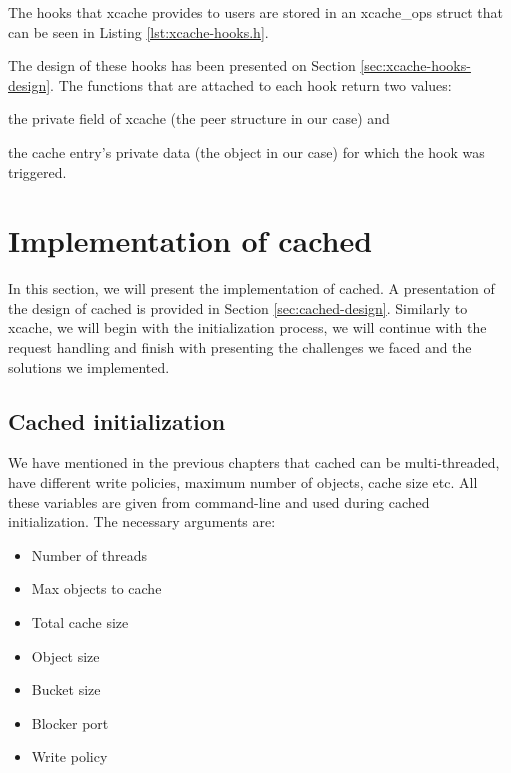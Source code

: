 The hooks that xcache provides to users are stored in an xcache\_ops struct 
that can be seen in Listing \ref{lst:xcache-hooks.h}.


The design of these hooks has been presented on Section 
\ref{sec:xcache-hooks-design}. The functions that are attached to each hook 
return two values:
\begin{inparaenum}
\item the private field of xcache (the peer structure in our case) and
\item the cache entry's private data (the object in our case) for which the 
	hook was triggered.
\end{inparaenum}

\section{Implementation of cached}\label{sec:cached-imp}

In this section, we will present the implementation of cached. A presentation 
of the design of cached is provided in Section \ref{sec:cached-design}.  
Similarly to xcache, we will begin with the initialization process, we will 
continue with the request handling and finish with presenting the challenges we 
faced and the solutions we implemented.

\subsection{Cached initialization}\label{sec:cached-init-imp}

We have mentioned in the previous chapters that cached can be multi-threaded, 
have different write policies, maximum number of objects, cache size etc. All 
these variables are given from command-line and used during cached 
initialization. The necessary arguments are:

\begin{itemize}
	\item Number of threads
	\item Max objects to cache
	\item Total cache size
	\item Object size
	\item Bucket size
	\item Blocker port
	\item Write policy
\end{itemize}

